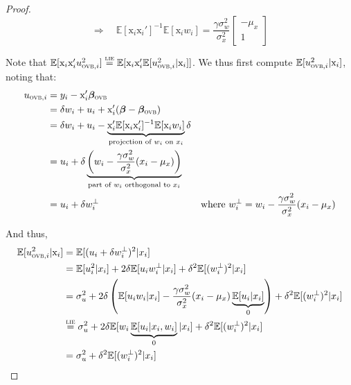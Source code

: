 \documentclass[usletter, 12pt]{article}
\begin{document}
\begin{proof}
				\begin{equation}\label{bias_ovb}
					\Rightarrow \quad
					\mathbb{E}[\text{x}_{i}\text{x}_i']^{-1}\mathbb{E}[\text{x}_{i}w_i] 
					=
					\dfrac{\gamma\sigma_{w}^{2}}{\sigma_{x}^{2}}
					\begin{bmatrix}
				    		- \mu_{x} \\
						1
					\end{bmatrix} 
				\end{equation}
				
				Note that $\mathbb{E}[\text{x}_{i}\text{x}_{i}'u_{\textsc{ovb}, i}^{2}] \overset{\textsc{lie}}{=} \mathbb{E}[\text{x}_{i}\text{x}_{i}'\mathbb{E}[u_{\textsc{ovb}, i}^{2} | \text{x}_{i}]]$. We thus first compute $\mathbb{E}[u_{\textsc{ovb}, i}^{2} | \text{x}_{i}]$, noting that:
				~
				\begin{align*}
            				u_{\textsc{ovb}, i} & =  y_i - \text{x}_i'\bm{\beta}_{\textsc{ovb}} \\
            					& = \delta w_{i} + u_i + \text{x}_i' (\bm{\beta} - \bm{\beta}_{\textsc{ovb}})\\
            					& = \delta w_{i} + u_i - \underbrace{\text{x}_{i}' \mathbb{E}[\text{x}_{i}\text{x}_{i}']^{-1} \mathbb{E}[\text{x}_{i}w_{i}]}_{\text{projection of $w_i$ on $x_i$}} \delta\\
            					& =  u_i + \delta \underbrace{\left(w_{i} - \dfrac{\gamma\sigma_{w}^{2}}{\sigma_{x}^{2}} (x_{i} - \mu_{x})\right)}_{\text{part of $w_i$ orthogonal to $x_i$}}\\
						& = u_i + \delta w_{i}^{\perp} & \text{where } w_{i}^{\perp} = w_{i} - \dfrac{\gamma\sigma_{w}^{2}}{\sigma_{x}^{2}} (x_{i} - \mu_{x})
				\end{align*}
				
				And thus,
				\begin{align*}
            				\mathbb{E}[u_{\textsc{ovb}, i}^{2} | \text{x}_{i}] & = \mathbb{E}[(u_i + \delta w_{i}^{\perp})^{2}| x_{i}]\\
					& = \mathbb{E}[u_{i}^{2} | x_{i}] + 2\delta \mathbb{E}[u_{i}w_{i}^{\perp} | x_{i}] + \delta^{2}\mathbb{E}[(w_{i}^{\perp})^{2} | x_{i}]\\
					& = \sigma_{u}^{2} + 2\delta \left( \mathbb{E}[u_{i}w_{i} | x_{i}] -  \dfrac{\gamma\sigma_{w}^{2}}{\sigma_{x}^{2}} (x_{i} - \mu_{x})\underbrace{\mathbb{E}[u_{i}|x_{i}]}_{0} \right) + \delta^{2}\mathbb{E}[(w_{i}^{\perp})^{2} | x_{i}]\\
					& \overset{\textsc{lie}}{=} \sigma_{u}^{2} + 2\delta \mathbb{E}[w_{i} \underbrace{\mathbb{E}[u_{i} | x_{i}, w_{i}]}_{0} | x_{i}] + \delta^{2}\mathbb{E}[(w_{i}^{\perp})^{2} | x_{i}]\\
					& = \sigma_{u}^{2} +  \delta^{2}\mathbb{E}[(w_{i}^{\perp})^{2} | x_{i}]
				\end{align*}
				

\end{proof}
\end{document}
